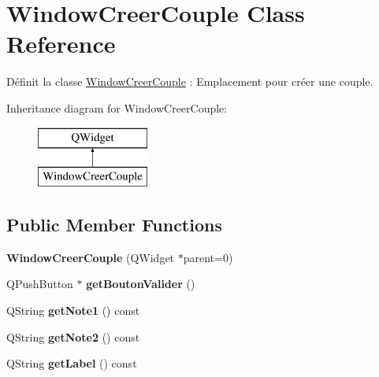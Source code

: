 \hypertarget{class_window_creer_couple}{}\section{Window\+Creer\+Couple Class Reference}
\label{class_window_creer_couple}


Définit la classe \hyperlink{class_window_creer_couple}{Window\+Creer\+Couple} \+: Emplacement pour créer une couple.  


Inheritance diagram for Window\+Creer\+Couple\+:\begin{figure}[H]
\begin{center}
\leavevmode
\includegraphics[height=2.000000cm]{class_window_creer_couple}
\end{center}
\end{figure}
\subsection*{Public Member Functions}
\begin{DoxyCompactItemize}
\item 
\mbox{\label{class_window_creer_couple_a950f6a9423a2deb211723f551cf61ea2}} 
{\bfseries Window\+Creer\+Couple} (Q\+Widget $\ast$parent=0)
\item 
\mbox{\label{class_window_creer_couple_a40c809914023acd99e54c14b42a832c9}} 
Q\+Push\+Button $\ast$ {\bfseries get\+Bouton\+Valider} ()
\item 
\mbox{\label{class_window_creer_couple_a35e6f537a9f0c5279283240e3e309e77}} 
Q\+String {\bfseries get\+Note1} () const
\item 
\mbox{\label{class_window_creer_couple_ac824ca2cd99b16928cf4564023a823d5}} 
Q\+String {\bfseries get\+Note2} () const
\item 
\mbox{\label{class_window_creer_couple_a502a974958e2978266bf57231803915a}} 
Q\+String {\bfseries get\+Label} () const
\end{DoxyCompactItemize}


